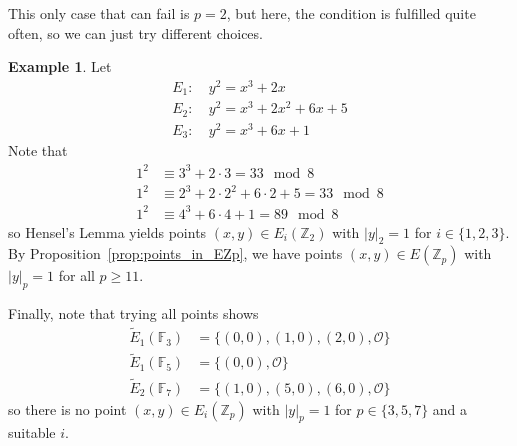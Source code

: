 \documentclass{scrartcl}
\newcommand{\Z}{\mathbb{Z}}
\newcommand{\F}{\mathbb{F}}
\renewcommand{\O}{\mathcal{O}}
\theoremstyle{definition}
\newtheorem{example}[prop]{Example}
\begin{document}
This only case that can fail is $p = 2$, but here, the condition is fulfilled quite often, so we can just try different choices.
\begin{example}
    Let
    \begin{align*}
        E_1: \ &y^2 = x^3 + 2 x \\
        E_2: \ &y^2 = x^3 + 2 x^2 + 6 x + 5\\
        E_3: \ &y^2 = x^3 + 6x + 1
    \end{align*}
    Note that
    \begin{align*}
        1^2 &\equiv 3^3 + 2 \cdot 3 = 33 \mod 8 \\
        1^2 &\equiv 2^3 + 2 \cdot 2^2 + 6 \cdot 2 + 5 = 33 \mod 8 \\
        1^2 &\equiv 4^3 + 6 \cdot 4 + 1 = 89 \mod 8
    \end{align*}
    so Hensel's Lemma yields points $(x, y) \in E_i(\Z_2)$ with $|y|_2 = 1$ for $i \in \{1, 2, 3\}$.
    By Proposition~\ref{prop:points_in_EZp}, we have points $(x, y) \in E(\Z_p)$ with $|y|_p = 1$ for all $p \geq 11$.

    Finally, note that trying all points shows
    \begin{align*}
        \tilde{E}_1(\F_3) &= \{ (0, 0), (1, 0), (2, 0), \O \} \\
        \tilde{E}_1(\F_5) &= \{ (0, 0), \O \} \\
        \tilde{E}_2(\F_7) &= \{ (1, 0), (5, 0), (6, 0), \O \}
    \end{align*}
    so there is no point $(x, y) \in E_i(\Z_p)$ with $|y|_p = 1$ for $p \in \{3, 5, 7\}$ and a suitable $i$. 
\end{example}
\end{document}
